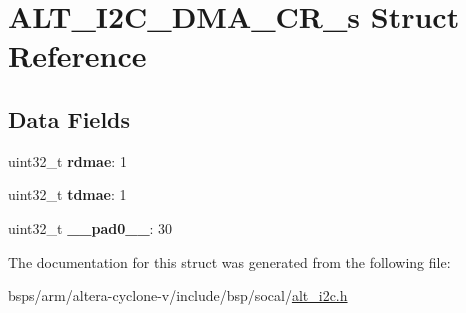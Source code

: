 \hypertarget{structALT__I2C__DMA__CR__s}{}\section{A\+L\+T\+\_\+\+I2\+C\+\_\+\+D\+M\+A\+\_\+\+C\+R\+\_\+s Struct Reference}
\label{structALT__I2C__DMA__CR__s}
\subsection*{Data Fields}
\begin{DoxyCompactItemize}
\item 
\mbox{\label{structALT__I2C__DMA__CR__s_a3318de07fef3c8198392d5a035ea90ee}} 
uint32\+\_\+t {\bfseries rdmae}\+: 1
\item 
\mbox{\label{structALT__I2C__DMA__CR__s_a46a9c8ceb2d8a161648c8a50b9c06c39}} 
uint32\+\_\+t {\bfseries tdmae}\+: 1
\item 
\mbox{\label{structALT__I2C__DMA__CR__s_a7c6399814da4bedbf5d6ff963fb1b5e8}} 
uint32\+\_\+t {\bfseries \+\_\+\+\_\+pad0\+\_\+\+\_\+}\+: 30
\end{DoxyCompactItemize}


The documentation for this struct was generated from the following file\+:\begin{DoxyCompactItemize}
\item 
bsps/arm/altera-\/cyclone-\/v/include/bsp/socal/\mbox{\hyperlink{socal_2alt__i2c_8h}{alt\+\_\+i2c.\+h}}\end{DoxyCompactItemize}
